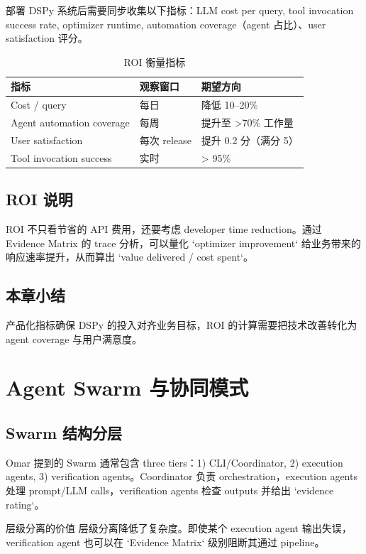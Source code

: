 \documentclass[a4paper]{article}
\begin{document}
部署 DSPy 系统后需要同步收集以下指标：LLM cost per query, tool invocation success rate, optimizer runtime, automation coverage（agent 占比）、user satisfaction 评分。

\begin{table}[H]
\centering
\caption{ROI 衡量指标}
\begin{tabular}{p{}p{}p{}}
\toprule
指标 & 观察窗口 & 期望方向 \\
\midrule
Cost / query & 每日 & 降低 10--20\% \\
Agent automation coverage & 每周 & 提升至 >70\% 工作量 \\
User satisfaction & 每次 release & 提升 0.2 分（满分 5） \\
Tool invocation success & 实时 & > 95\% \\
\bottomrule
\end{tabular}
\end{table}

\subsection{ROI 说明}

ROI 不只看节省的 API 费用，还要考虑 developer time reduction。通过 Evidence Matrix 的 trace 分析，可以量化 `optimizer improvement` 给业务带来的响应速率提升，从而算出 `value delivered / cost spent`。

\subsection{本章小结}

产品化指标确保 DSPy 的投入对齐业务目标，ROI 的计算需要把技术改善转化为 agent coverage 与用户满意度。

\section{Agent Swarm 与协同模式}

\subsection{Swarm 结构分层}

Omar 提到的 Swarm 通常包含 three tiers：1) CLI/Coordinator, 2) execution agents, 3) verification agents。Coordinator 负责 orchestration，execution agents 处理 prompt/LLM calls，verification agents 检查 outputs 并给出 `evidence rating`。

\begin{importantbox}{层级分离的价值}
层级分离降低了复杂度。即使某个 execution agent 输出失误，verification agent 也可以在 `Evidence Matrix` 级别阻断其通过 pipeline。
\end{importantbox}
\end{document}
